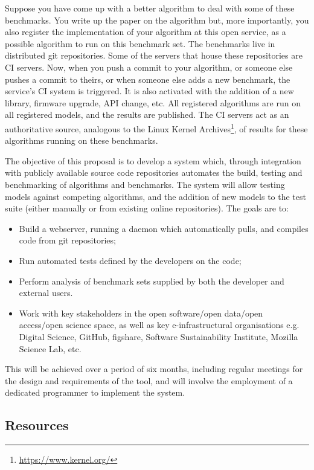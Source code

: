 \documentclass[a4paper,11pt]{article}
\begin{document}
Suppose you have come up with a better algorithm to deal with some of
these benchmarks. You write up the paper on the algorithm but, more
importantly, you also register the implementation of your algorithm at
this open service, as a possible algorithm to run on this benchmark
set. The benchmarks live in distributed git 
repositories. Some of the servers that house these repositories are CI
servers. Now, when you push a commit to your algorithm, or someone
else pushes a commit to theirs, or when someone else adds a new
benchmark, the service's CI system is triggered. It is also activated
with the addition of a new library, firmware upgrade, API change,
etc. All registered algorithms are run on all registered models, and
the results are published. The CI servers act as an authoritative
source, analogous to the Linux Kernel
Archives\footnote{\url{https://www.kernel.org/}}, of results for these
algorithms running on these benchmarks.

The objective of this proposal is to develop a system which, through
integration with publicly available source code repositories automates
the build, testing and benchmarking of algorithms and benchmarks. The 
system will allow testing models against competing algorithms, and the
addition of new models to the test suite (either manually or from existing
online repositories). The goals are to:

\begin{itemize}
	\item Build a webserver, running a daemon which automatically pulls, and compiles
code from git repositories;
\item Run automated tests defined by the developers on the code;
\item Perform analysis of benchmark sets supplied by both the developer and external
users.
\item Work with key stakeholders in the open software/open data/open access/open
  science space, as well as key e-infrastructural organisations
  e.g. Digital Science, GitHub, figshare, Software Sustainability
  Institute, Mozilla Science Lab, etc.
\end{itemize}

This will be achieved over a period of six months, including regular
meetings for the design and requirements of the tool, and will involve
the employment of a dedicated programmer to implement the system.

\subsection*{Resources}
\end{document}

